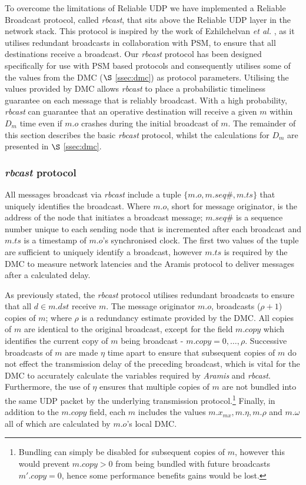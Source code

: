     To overcome the limitations of Reliable UDP we have implemented a Reliable Broadcast protocol, called  \emph{rbcast}, that sits above the Reliable UDP layer in the network stack.  This protocol is inspired by the work of  Ezhilchelvan \emph{et al.} \citep{ezhilchelvan2011near}, as it utilises redundant broadcasts in collaboration with PSM, to ensure that all destinations receive a broadcast.  Our \emph{rbcast} protocol has been designed specifically for use with PSM based protocols and consequently utilises some of the values from the DMC ($\S$ \ref{ssec:dmc}) as protocol parameters.  Utilising the values provided by DMC allows  \emph{rbcast} to place a probabilistic timeliness guarantee on each message that is reliably broadcast.  With a high probability, \emph{rbcast} can guarantee that an operative destination will receive a given $m$ within $D_m$ time even if $m.o$ crashes during the initial broadcast of $m$.  The remainder of this section describes the basic \emph{rbcast} protocol, whilst the calculations for $D_m$ are presented in $\S$ \ref{ssec:dmc}.
    
    \subsubsection*{\emph{rbcast} protocol}
    All messages broadcast via \emph{rbcast} include a tuple $\{m.o, m.seq\#, m.ts\}$ that uniquely identifies the broadcast.  Where $m.o$, short for message originator, is the address of the node that initiates a broadcast message; $m.seq\#$ is a sequence number unique to each sending node that is incremented after each broadcast and $m.ts$ is a timestamp of $m.o$'s synchronised clock.  The first two values of the tuple are sufficient to uniquely identify a broadcast, however $m.ts$ is required by the DMC to measure network latencies and the \textsf{Aramis} protocol to deliver messages after a calculated delay.  
    
    As previously stated, the \emph{rbcast} protocol utilises redundant broadcasts to ensure that all $d \in m.dst$ receive $m$.  The message originator $m.o$, broadcasts ($\rho + 1$) copies of $m$; where $\rho$ is a redundancy estimate provided by the DMC.  All copies of $m$ are identical to the original broadcast, except for the field $m.copy$ which identifies the current copy of $m$ being broadcast - $m.copy = 0,\ldots,\rho$.  Successive broadcasts of $m$ are made $\eta$ time apart to ensure that subsequent copies of $m$ do not effect the transmission delay of the preceding broadcast, which is vital for the DMC to accurately calculate the variables required by \emph{Aramis} and \emph{rbcast}.  Furthermore, the use of $\eta$ ensures that multiple copies of $m$ are not bundled into the same UDP packet by the underlying transmission protocol.\footnote{Bundling can simply be disabled for subsequent copies of $m$, however this would prevent $m.copy > 0$ from being bundled with future broadcasts $m'.copy = 0$, hence some performance benefits gains would be lost.}  Finally, in addition to the $m.copy$ field, each $m$ includes the values  $m.x_{mx}, m.\eta, m.\rho$ and $m.\omega$ all of which are calculated by $m.o$'s local DMC.  
    
